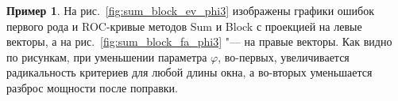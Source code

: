\documentclass[specialist,
substylefile = spbu_report.rtx,
subf,href,colorlinks=true, 12pt]{disser}
\theoremstyle{definition}
\newtheorem{example}{Пример}
\begin{document}
\begin{example}
\begin{table}[h]
	\end{table}
	На рис.~\ref{fig:sum_block_ev_phi3} изображены графики ошибок первого рода и ROC-кривые методов Sum и Block с проекцией на левые векторы, а на рис.~\ref{fig:sum_block_fa_phi3} "--- на правые векторы. Как видно по рисункам, при уменьшении параметра $\varphi$, во-первых, увеличивается радикальность критериев для любой длины окна, а во-вторых уменьшается разброс мощности после поправки.
\end{example}
\end{document}
